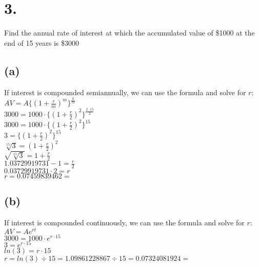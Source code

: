 \documentclass{article}
\begin{document}
\section*{3.}
{\Large 

Find the annual rate of interest at which the accumulated value of \$1000 at the end of 15 years is \$3000

\subsection*{(a)}

If interest is compounded semiannually, we can use the formula and solve for $r$: \\
$AV = A\{(1 + \frac{r}{m})^m\}^{\frac{k}{m}}$ \\
$3000 = 1000 \cdot \{(1 + \frac{r}{2})^2\}^{\frac{2 \cdot 15}{2}}$ \\
$3000 = 1000 \cdot \{(1 + \frac{r}{2})^2\}^{15}$ \\
$3 = \{(1 + \frac{r}{2})^2\}^{15}$ \\
$\sqrt[15]{3} = (1 + \frac{r}{2})^2$ \\
$\sqrt{\sqrt[15]{3}} = 1 + \frac{r}{2}$ \\
$1.03729919731 - 1 = \frac{r}{2}$ \\
$0.03729919731 \cdot 2 = r$ \\
$r = 0.07459839462 = $ 

\subsection*{(b)}

If interest is compounded continuously, we can use the formula and solve for $r$: \\
$AV = Ae^{rt}$ \\
$3000 = 1000 \cdot e^{r \cdot 15}$ \\
$3 = e^{r \cdot 15}$ \\
$ln(3) = r \cdot 15$ \\
$r = ln(3) \div 15 = 1.09861228867 \div 15 = 0.07324081924 = $ 

}
\end{document}
